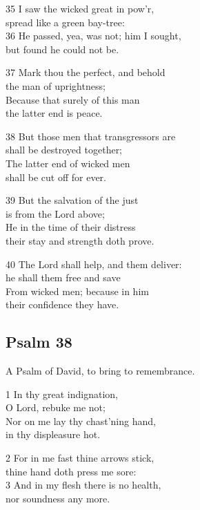 \begin{multicols}{3}
35 I saw the wicked great in pow’r,\\
spread like a green bay-tree:\\
36 He passed, yea, was not; him I sought,\\
but found he could not be.

37 Mark thou the perfect, and behold\\
the man of uprightness;\\
Because that surely of this man\\
the latter end is peace.

38 But those men that transgressors are\\
shall be destroyed together;\\
The latter end of wicked men\\
shall be cut off for ever.

39 But the salvation of the just\\
is from the Lord above;\\
He in the time of their distress\\
their stay and strength doth prove.

40 The Lord shall help, and them deliver:\\
he shall them free and save\\
From wicked men; because in him\\
their confidence they have.

\begin{center}
\quad{}\quad{}
\end{center}

\subsection*{Psalm 38}

A Psalm of David, to bring to remembrance.

1 In thy great indignation,\\
O Lord, rebuke me not;\\
Nor on me lay thy chast’ning hand,\\
in thy displeasure hot.

2 For in me fast thine arrows stick,\\
thine hand doth press me sore:\\
3 And in my flesh there is no health,\\
nor soundness any more.


\end{multicols}
